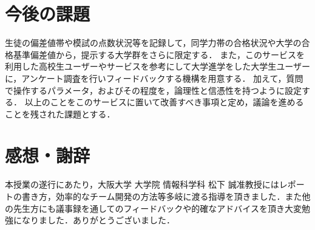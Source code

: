 \documentclass[a4j, titlepage]{jarticle}
\begin{document}
\section{今後の課題}
生徒の偏差値帯や模試の点数状況等を記録して，同学力帯の合格状況や大学の合格基準偏差値から，提示する大学群をさらに限定する．
また，このサービスを利用した高校生ユーザーやサービスを参考にして大学進学をした大学生ユーザーに，アンケート調査を行いフィードバックする機構を用意する．
加えて，質問で操作するパラメータ，およびその程度を，論理性と信憑性を持つように設定する．
以上のことをこのサービスに置いて改善すべき事項と定め，議論を進めることを残された課題とする．

\section{感想・謝辞}
本授業の遂行にあたり，大阪大学 大学院 情報科学科 松下 誠准教授にはレポートの書き方，効率的なチーム開発の方法等多岐に渡る指導を頂きました．また他の先生方にも議事録を通してのフィードバックや的確なアドバイスを頂き大変勉強になりました．ありがとうございました．
\end{document}
